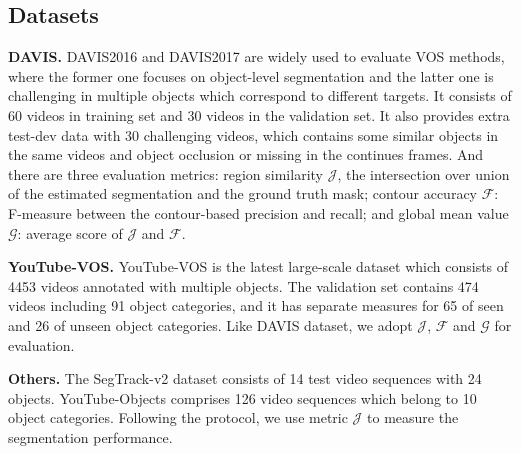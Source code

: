 \documentclass[letterpaper]{article} %
\begin{document}
\subsection{Datasets}
\textbf{DAVIS.} DAVIS2016 and DAVIS2017 \cite{pont20172017} are widely used to evaluate VOS methods, where the former one focuses on object-level segmentation and the latter one is challenging in multiple objects which correspond to different targets. 
It consists of 60 videos in training set and 30 videos in the validation set. It also provides extra test-dev data with 30 challenging videos, which contains some similar objects in the same videos and object occlusion or missing in the continues frames. 
And there are three evaluation metrics: region similarity $\mathcal{J}$, the intersection over union of the estimated segmentation and the ground truth mask; contour accuracy $\mathcal{F}$: F-measure between the contour-based precision and recall; and global mean value $\mathcal{G}$: average score of $\mathcal{J}$ and $\mathcal{F}$.

\noindent \textbf{YouTube-VOS.} YouTube-VOS \cite{xu2018youtube} is the latest large-scale dataset which consists of 4453 videos annotated with multiple objects. The validation set contains 474 videos including 91 object categories, and it has separate measures for 65 of seen and 26 of unseen object categories. Like DAVIS dataset, we adopt $\mathcal{J}$, $\mathcal{F}$ and $\mathcal{G}$ for evaluation.

\noindent \textbf{Others.} The SegTrack-v2 dataset \cite{li2013video} consists of 14 test video sequences with 24 objects. YouTube-Objects \cite{prest2012learning} comprises 126 video sequences which belong to 10 object categories. Following the protocol, we use metric $\mathcal{J}$ to measure the segmentation performance.
\end{document}

